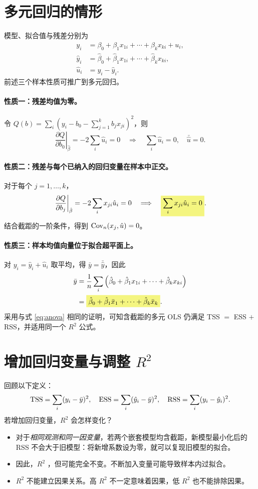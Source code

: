\section{多元回归的情形}
\label{sec:multiple-properties}
模型、拟合值与残差分别为
\begin{align*}
y_i&=\beta_0+\beta_1x_{1i}+\cdots+\beta_kx_{ki}+u_i,\\
\hat y_i&=\hat\beta_0+\hat\beta_1x_{1i}+\cdots+\hat\beta_kx_{ki},\\
\hat u_i&=y_i-\hat y_i.
\end{align*}
前述三个样本性质可推广到多元回归。

\paragraph{性质一：残差均值为零。}
令 $Q(b)=\sum_i(y_i-b_0-\sum_{j=1}^k b_jx_{ji})^2$，则
\[\left.\frac{\partial Q}{\partial b_0}\right|_{\hat\beta}
=-2\sum_i\hat u_i=0
\quad\Longrightarrow\quad\sum_i\hat u_i=0,\quad\bar{\hat u}=0.\]

\paragraph{性质二：残差与每个已纳入的回归变量在样本中正交。}
对于每个 $j=1,\ldots,k$，
\[\left.\frac{\partial Q}{\partial b_j}\right|_{\hat\beta}
=-2\sum_i x_{ji}\hat u_i=0
\quad\Longrightarrow\quad\hm{\sum_i x_{ji}\hat u_i=0}.\]
结合截距的一阶条件，得到 $\operatorname{Cov}_n(x_j,\hat u)=0$。

\paragraph{性质三：样本均值向量位于拟合超平面上。}
对 $y_i=\hat y_i+\hat u_i$ 取平均，得 $\bar y=\bar{\hat y}$，因此
\begin{align*}
\bar y
&=\frac1n\sum_i\left(\hat\beta_0+\hat\beta_1x_{1i}+\cdots+\hat\beta_kx_{ki}\right)\\
&=\hm{\hat\beta_0+\hat\beta_1\bar x_1+\cdots+\hat\beta_k\bar x_k}.
\end{align*}
采用与式 \eqref{eq:anova} 相同的证明，可知含截距的多元 OLS 仍满足 TSS $=$ ESS $+$ RSS，并适用同一个 $R^2$ 公式。

\section[增加回归变量与调整判定系数]{增加回归变量与调整 $R^2$}
\label{sec:adjusted-r2}
回顾以下定义：
\[\operatorname{TSS}=\sum_i(y_i-\bar y)^2,\quad
\operatorname{ESS}=\sum_i(\hat y_i-\bar y)^2,\quad
\operatorname{RSS}=\sum_i(y_i-\hat y_i)^2.\]
若增加回归变量，$R^2$ 会怎样变化？
\begin{itemize}
\item 对于\emph{相同观测和同一因变量}，若两个嵌套模型均含截距，新模型最小化后的 RSS 不会大于旧模型：将新增系数设为零，就可以复现旧模型的拟合。
\item 因此，$R^2$ ，但可能完全不变。不断加入变量可能导致样本内过拟合。
\item $R^2$ 不能建立因果关系。高 $R^2$ 不一定意味着因果，低 $R^2$ 也不能排除因果。
\end{itemize}

